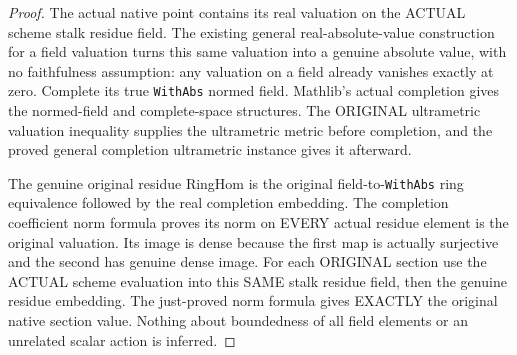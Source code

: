 \begin{proof}
The actual native point contains its real valuation on the ACTUAL scheme
stalk residue field. The existing general real-absolute-value construction
for a field valuation turns this same valuation into a genuine absolute
value, with no faithfulness assumption: any valuation on a field already
vanishes exactly at zero. Complete its true \texttt{WithAbs} normed field.
Mathlib's actual completion gives the normed-field and complete-space
structures. The ORIGINAL ultrametric valuation inequality supplies the
ultrametric metric before completion, and the proved general completion
ultrametric instance gives it afterward.

The genuine original residue RingHom is the original field-to-\texttt{WithAbs}
ring equivalence followed by the real completion embedding. The completion
coefficient norm formula proves its norm on EVERY actual residue element is
the original valuation. Its image is dense because the first map is actually
surjective and the second has genuine dense image. For each ORIGINAL section
use the ACTUAL scheme evaluation into this SAME stalk residue field, then
the genuine residue embedding. The just-proved norm formula gives EXACTLY
the original native section value. Nothing about boundedness of all field
elements or an unrelated scalar action is inferred.
\end{proof}

